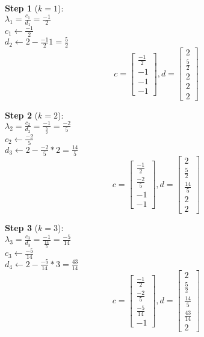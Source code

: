 \documentclass[12pt]{article}
\begin{document}
\textbf{Step 1} ($k=1$): \\
$ \lambda_1 = \frac{c_1}{d_1} = \frac{-1}{2} $ \\
$ c_1 \gets \frac{-1}{2} $ \\
$ d_2 \gets 2 - \frac{-1}{2} 1 = \frac{5}{2} $ \\


$$c = \begin{bmatrix}
  \frac{-1}{2} \\
  -1 \\
  -1 \\
  -1
\end{bmatrix}, d = \begin{bmatrix}
  2 \\
  \frac{5}{2} \\
  2 \\
  2 \\
  2
\end{bmatrix}$$

\textbf{Step 2} ($k=2$): \\
$ \lambda_2 = \frac{c_2}{d_2} = \frac{-1}{\frac{5}{2}} = \frac{-2}{5} $ \\
$ c_2 \gets \frac{-2}{5} $ \\
$ d_3 \gets 2 - \frac{-2}{5} * 2 = \frac{14}{5} $ \\

$$c = \begin{bmatrix}
  \frac{-1}{2} \\
  \frac{-2}{5} \\
  -1 \\
  -1
\end{bmatrix}, d = \begin{bmatrix}
  2 \\
  \frac{5}{2} \\
  \frac{14}{5} \\
  2 \\
  2
\end{bmatrix}$$

\textbf{Step 3} ($k=3$): \\
$ \lambda_3 = \frac{c_3}{d_3} = \frac{-1}{\frac{14}{5}} = \frac{-5}{14} $ \\
$ c_3 \gets \frac{-5}{14} $ \\
$ d_4 \gets 2 - \frac{-5}{14} * 3 = \frac{43}{14} $ \\

$$c = \begin{bmatrix}
  \frac{-1}{2} \\
  \frac{-2}{5} \\
  \frac{-5}{14} \\
  -1
\end{bmatrix}, d = \begin{bmatrix}
  2 \\
  \frac{5}{2} \\
  \frac{14}{5} \\
  \frac{43}{14} \\
  2
\end{bmatrix}$$
\end{document}
